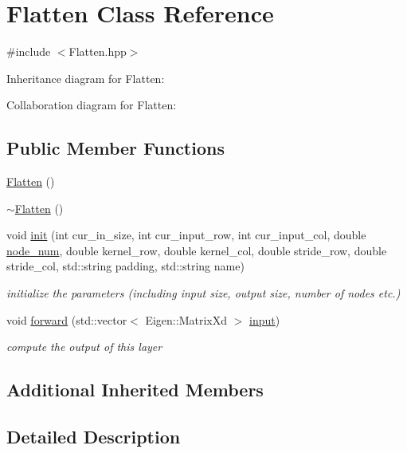 \hypertarget{class_flatten}{}\section{Flatten Class Reference}
\label{class_flatten}


{\ttfamily \#include $<$Flatten.\+hpp$>$}



Inheritance diagram for Flatten\+:


Collaboration diagram for Flatten\+:
\subsection*{Public Member Functions}
\begin{DoxyCompactItemize}
\item 
\hyperlink{class_flatten_ab8e78a47501be2fa2b7e34f9b92e491a}{Flatten} ()
\item 
\hyperlink{class_flatten_a5542c21b0de6d9fb820eb0616d32ea4d}{$\sim$\+Flatten} ()
\item 
void \hyperlink{class_flatten_af389526bc8d45a447eaf2a3f8336d2a8}{init} (int cur\+\_\+in\+\_\+size, int cur\+\_\+input\+\_\+row, int cur\+\_\+input\+\_\+col, double \hyperlink{class_layer_a2f19878482d098654fb084b9c21b72ed}{node\+\_\+num}, double kernel\+\_\+row, double kernel\+\_\+col, double stride\+\_\+row, double stride\+\_\+col, std\+::string padding, std\+::string name)
\begin{DoxyCompactList}\small\item\em initialize the parameters (including input size, output size, number of nodes etc.) \end{DoxyCompactList}\item 
void \hyperlink{class_flatten_acc0cfdfd9736b2908dae4ccf2006df02}{forward} (std\+::vector$<$ Eigen\+::\+Matrix\+Xd $>$ \hyperlink{class_layer_a5213366d9a5a7317c5d40d9efdcfa623}{input})
\begin{DoxyCompactList}\small\item\em compute the output of this layer \end{DoxyCompactList}\end{DoxyCompactItemize}
\subsection*{Additional Inherited Members}


\subsection{Detailed Description}


